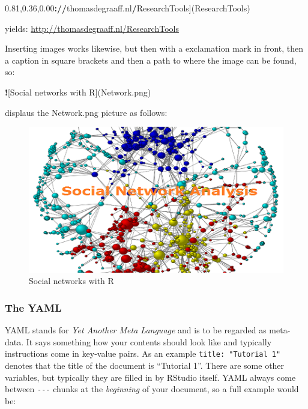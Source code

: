 \documentclass[]{article}
\newenvironment{Shaded}{\begin{snugshade}}{\end{snugshade}}
\newcommand{\OperatorTok}[1]{\textcolor[rgb]{0.81,0.36,0.00}{\textbf{#1}}}
\newcommand{\ErrorTok}[1]{\textcolor[rgb]{0.64,0.00,0.00}{\textbf{#1}}}
\newcommand{\NormalTok}[1]{#1}
\theoremstyle{definition}
\theoremstyle{definition}
\theoremstyle{definition}
\theoremstyle{remark}
\begin{document}
\begin{Shaded}
\begin{Highlighting}[]
\NormalTok{[http}\OperatorTok{:}\ErrorTok{//}\NormalTok{thomasdegraaff.nl}\OperatorTok{/}\NormalTok{ResearchTools](ResearchTools)}
\end{Highlighting}
\end{Shaded}

yields: \href{ResearchTools}{http://thomasdegraaff.nl/ResearchTools}

Inserting images works likewise, but then with a exclamation mark in
front, then a caption in square brackets and then a path to where the
image can be found, so:

\begin{Shaded}
\begin{Highlighting}[]
\OperatorTok{!}\NormalTok{[Social networks with R](Network.png)}
\end{Highlighting}
\end{Shaded}

displaus the Network.png picture as follows:

\begin{figure}
\centering
\includegraphics{Network.png}
\caption{Social networks with R}
\end{figure}

\subsubsection{The YAML}\label{the-yaml}

YAML stands for \emph{Yet Another Meta Language} and is to be regarded
as meta-data. It says something how your contents should look like and
typically instructions come in key-value pairs. As an example
\texttt{title:\ "Tutorial\ 1"} denotes that the title of the document is
``Tutorial 1''. There are some other variables, but typically they are
filled in by RStudio itself. YAML always come between \texttt{-\/-\/-}
chunks at the \emph{beginning} of your document, so a full example would
be:
\end{document}
